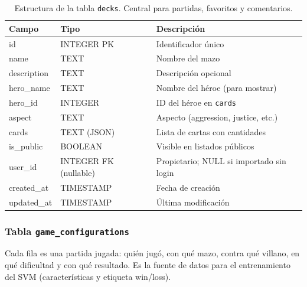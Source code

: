 \begin{table}[H]
    \centering
    \small
    \begin{tabular}{|l|l|l|}
        \hline
        \textbf{Campo} & \textbf{Tipo} & \textbf{Descripción} \\
        \hline
        id & INTEGER PK & Identificador único \\
        name & TEXT & Nombre del mazo \\
        description & TEXT & Descripción opcional \\
        hero\_name & TEXT & Nombre del héroe (para mostrar) \\
        hero\_id & INTEGER & ID del héroe en \texttt{cards} \\
        aspect & TEXT & Aspecto (aggression, justice, etc.) \\
        cards & TEXT (JSON) & Lista de cartas con cantidades \\
        is\_public & BOOLEAN & Visible en listados públicos \\
        user\_id & INTEGER FK (nullable) & Propietario; NULL si importado sin login \\
        created\_at & TIMESTAMP & Fecha de creación \\
        updated\_at & TIMESTAMP & Última modificación \\
        \hline
    \end{tabular}
    \caption{Estructura de la tabla \texttt{decks}. Central para partidas, favoritos y comentarios.}
    \label{tab:decks}
\end{table}

\subsubsection{Tabla \texttt{game\_configurations}}

Cada fila es una partida jugada: quién jugó, con qué mazo, contra qué villano, en qué dificultad y con qué resultado. Es la fuente de datos para el entrenamiento del SVM (características y etiqueta win/loss).

